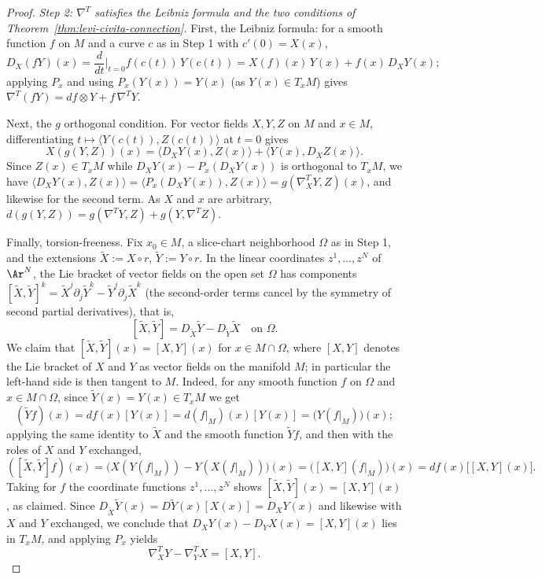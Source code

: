 \begin{proof}
\emph{Step 2: $\nabla^T$ satisfies the Leibniz formula and the
two conditions of Theorem~\ref{thm:levi-civita-connection}.}
First, the Leibniz formula: for a smooth function $f$ on $M$ and
a curve $c$ as in Step 1 with $c'(0)=X(x)$,
$$D_X(fY)(x)=\frac{d}{dt}\Big|_{t=0}f(c(t))\,Y(c(t))
=X(f)(x)\,Y(x)+f(x)\,D_XY(x);$$
applying $P_x$ and using $P_x(Y(x))=Y(x)$ (as $Y(x)\in T_xM$)
gives $\nabla^T(fY)=df\otimes Y+f\,\nabla^TY$.

Next, the $g$ orthogonal condition. For vector fields $X,Y,Z$ on
$M$ and $x\in M$, differentiating
$t\mapsto\langle Y(c(t)),Z(c(t))\rangle$ at $t=0$ gives
$$X(g(Y,Z))(x)=\langle D_XY(x),Z(x)\rangle
+\langle Y(x),D_XZ(x)\rangle.$$
Since $Z(x)\in T_xM$ while $D_XY(x)-P_x(D_XY(x))$ is orthogonal
to $T_xM$, we have $\langle D_XY(x),Z(x)\rangle
=\langle P_x(D_XY(x)),Z(x)\rangle=g(\nabla^T_XY,Z)(x)$, and
likewise for the second term. As $X$ and $x$ are arbitrary,
$d(g(Y,Z))=g(\nabla^TY,Z)+g(Y,\nabla^TZ)$.

Finally, torsion-freeness. Fix $x_0\in M$, a slice-chart
neighborhood $\Omega$ as in Step 1, and the extensions
$\widetilde X:=X\circ r$, $\widetilde Y:=Y\circ r$. In the linear
coordinates $z^1,\ldots,z^N$ of $\Ar^N$, the Lie bracket of
vector fields on the open set $\Omega$ has components
$[\widetilde X,\widetilde Y]^k
=\widetilde X^j\partial_j\widetilde Y^k
-\widetilde Y^j\partial_j\widetilde X^k$ (the second-order terms
cancel by the symmetry of second partial derivatives), that is,
$$[\widetilde X,\widetilde Y]
=D_{\widetilde X}\widetilde Y-D_{\widetilde Y}\widetilde X
\quad\text{on }\Omega.$$
We claim that $[\widetilde X,\widetilde Y](x)=[X,Y](x)$ for $x\in
M\cap\Omega$, where $[X,Y]$ denotes the Lie bracket of $X$ and
$Y$ as vector fields on the manifold $M$; in particular the
left-hand side is then tangent to $M$. Indeed, for any smooth
function $f$ on $\Omega$ and $x\in M\cap\Omega$, since
$\widetilde Y(x)=Y(x)\in T_xM$ we get
$$(\widetilde Yf)(x)=df(x)[Y(x)]=d(f|_M)(x)[Y(x)]
=\bigl(Y(f|_M)\bigr)(x);$$
applying the same identity to $\widetilde X$ and the smooth
function $\widetilde Yf$, and then with the roles of $X$ and $Y$
exchanged,
$$([\widetilde X,\widetilde Y]f)(x)
=\bigl(X(Y(f|_M))-Y(X(f|_M))\bigr)(x)
=\bigl([X,Y](f|_M)\bigr)(x)=df(x)\bigl[[X,Y](x)\bigr].$$
Taking for $f$ the coordinate functions $z^1,\ldots,z^N$ shows
$[\widetilde X,\widetilde Y](x)=[X,Y](x)$, as claimed. Since
$D_{\widetilde X}\widetilde Y(x)=D\widetilde Y(x)[X(x)]
=D_XY(x)$ and likewise with $X$ and $Y$ exchanged, we conclude
that $D_XY(x)-D_YX(x)=[X,Y](x)$ lies in $T_xM$, and applying
$P_x$ yields
$$\nabla^T_XY-\nabla^T_YX=[X,Y].$$


\end{proof}
